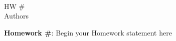 \documentclass[12pt]{article}
\theoremstyle{remark}
\begin{document}
\begin{center}
 \\[12pt]
HW \# \\[12pt]
Authors\\
\end{center}

\begin{framed}
\textbf{Homework \#}: Begin your Homework statement here
\end{framed}
\end{document}
